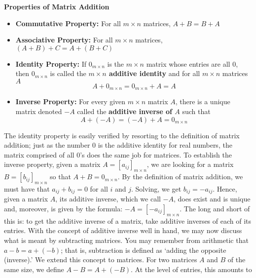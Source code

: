 \smallskip
\colorbox{ResultColor}{\bbm
\begin{thm} \label{matrixadditionprops}  \textbf{Properties of Matrix Addition} 
\begin{itemize}

\item  \textbf{Commutative Property:}  For all $m \times n$ matrices, $A + B = B + A$
\item  \textbf{Associative Property:}  For all $m \times n$ matrices, $(A + B) + C = A + (B + C)$
\item  \textbf{Identity Property:} If $0_{m \times n}$ is the $m \times n$ matrix whose entries are all $0$, then $0_{m \times n}$ is called the  \textbf{\boldmath $m \times n$ additive identity} and for all $m \times n$ matrices $A$ \[A + 0_{m \times n} = 0_{m \times n} + A = A\] 
\item  \textbf{Inverse Property:} For every given $m \times n$ matrix $A$, there is a unique matrix denoted $-A$ called the  \textbf{additive inverse of \boldmath $A$} such that \[A + (-A) = (-A) + A = 0_{m \times n}\] 
\end{itemize}
\end{thm}
\ebm}

\smallskip

The identity property is easily verified by resorting to the definition of matrix addition;  just as the number $0$ is the additive identity for real numbers, the matrix comprised of all $0$'s does the same job for matrices.  To establish the inverse property, given a matrix $A=\left[a_{ij}\right]_{m \times n}$, we are looking for a matrix $B = \left[b_{ij}\right]_{m \times n}$ so that $A + B = 0_{m \times n}$.  By the definition of matrix addition, we must have that $a_{ij} + b_{ij} = 0$ for all $i$ and $j$.  Solving,  we get $b_{ij} = -a_{ij}$.   Hence, given a matrix $A$, its additive inverse, which we call $-A$, does exist and is unique and, moreover, is given by the formula:  $-A = \left[ - a_{ij}\right]_{m \times n}$.  The long and short of this is: to get the additive inverse of a matrix, take additive inverses of each of its entries.  With the concept of additive inverse well in hand, we may now discuss what is meant by subtracting matrices.  You may remember from arithmetic that $a - b = a+(-b)$;  that is, subtraction is defined as `adding the opposite (inverse).'  We extend this concept to matrices.  For two matrices $A$ and $B$  of the same size, we define $A-B = A + (-B)$.  At the level of entries, this amounts to

